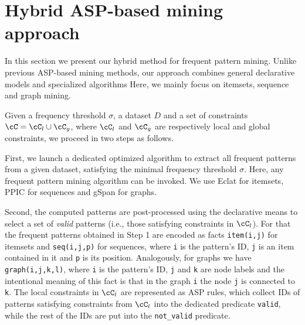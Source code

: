 \section{Hybrid ASP-based mining approach}\label{sec:problem}

In this section we present our hybrid method for frequent pattern mining. Unlike previous ASP-based mining methods, our approach combines general declarative models and specialized algorithms  Here, we mainly focus on itemsets, sequence and graph mining. 

Given a frequency threshold $\sigma$, a dataset $D$ and a set of constraints $\cC=\cC_l\cup\cC_g$, where $\cC_l$ and $\cC_g$ are respectively local and global constraints, we proceed in two steps as follows. 
\bigskip

 First, we launch a dedicated optimized algorithm to extract all frequent patterns from a given dataset, satisfying the minimal frequency threshold $\sigma$. Here, any frequent pattern mining algorithm can be invoked. %
We use Eclat \parencite{eclat} for itemsets, PPIC \parencite{PPIC} for sequences and gSpan \parencite{gspan} for graphs.
\bigskip

 Second, the computed patterns are post-processed using the declarative means to select a set of \emph{valid} patterns (i.e., those satisfying constraints in $\cC_l$). For that the frequent patterns obtained in Step 1 are encoded as facts \texttt{item(i,j)} for itemsets and \texttt{seq(i,j,p)} for sequences, where \texttt{i} is the pattern's ID, \texttt{j} is an item contained in it and \texttt{p} is its position. Analogously, for graphs we have \texttt{graph(i,j,k,l)}, where \texttt{i} is the pattern's ID, \texttt{j} and \texttt{k} are node labels and the intentional meaning of this fact is that in the graph \texttt{i} the node \texttt{j} is connected to \texttt{k}. The local constraints in $\cC_l$ are represented as ASP rules, which collect IDs of patterns satisfying constraints from $\cC_l$ into the dedicated predicate \texttt{valid}, while the rest of the IDs are put into the \texttt{not\_valid} predicate. 

